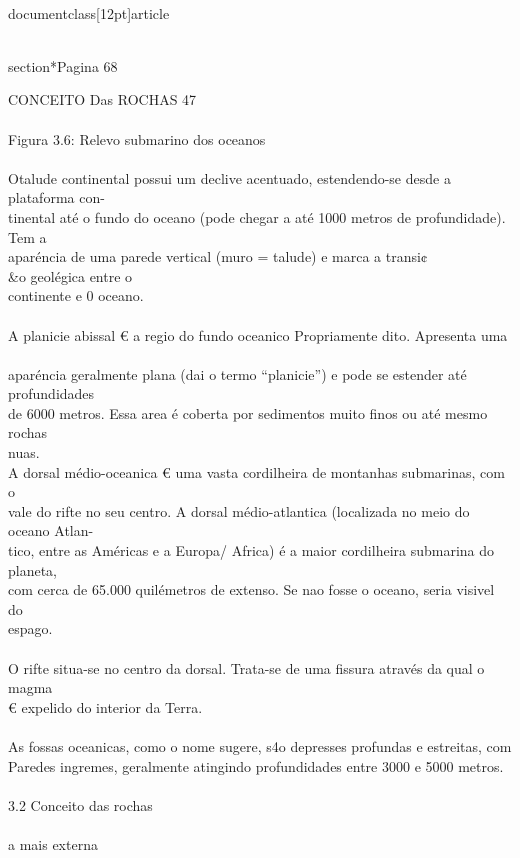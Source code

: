\\documentclass[12pt]{article}
\begin{document}
\\section*{Pagina 68}

CONCEITO Das ROCHAS 47\\
\\
Figura 3.6: Relevo submarino dos oceanos\\
\\
Otalude continental possui um declive acentuado, estendendo-se desde a plataforma con-\\
tinental até o fundo do oceano (pode chegar a até 1000 metros de profundidade). Tem a\\
aparéncia de uma parede vertical (muro = talude) e marca a transi¢\\&o geolégica entre o\\
continente e 0 oceano.\\
\\
A planicie abissal € a regio do fundo oceanico Propriamente dito. Apresenta uma\\
\\
aparéncia geralmente plana (dai o termo “planicie”) e pode se estender até profundidades\\
de 6000 metros. Essa area é coberta por sedimentos muito finos ou até mesmo rochas\\
nuas.\\
A dorsal médio-oceanica € uma vasta cordilheira de montanhas submarinas, com o\\
vale do rifte no seu centro. A dorsal médio-atlantica (localizada no meio do oceano Atlan-\\
tico, entre as Américas e a Europa/ Africa) é a maior cordilheira submarina do planeta,\\
com cerca de 65.000 quilémetros de extenso. Se nao fosse o oceano, seria visivel do\\
espago.\\
\\
O rifte situa-se no centro da dorsal. Trata-se de uma fissura através da qual o magma\\
€ expelido do interior da Terra.\\
\\
As fossas oceanicas, como o nome sugere, s4o depresses profundas e estreitas, com\\
Paredes ingremes, geralmente atingindo profundidades entre 3000 e 5000 metros.\\
\\
3.2 Conceito das rochas\\
\\
a mais externa\\
\end{document}
